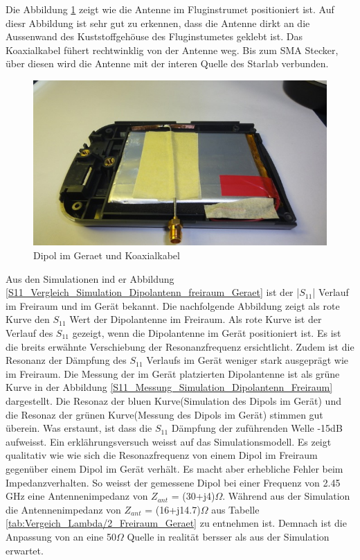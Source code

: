 \newpage
Die Abbildung \ref{fig:DipolimGeraet} zeigt wie die Antenne im Fluginstrumet positioniert ist. Auf diesr Abbildung ist sehr gut zu erkennen, dass die Antenne dirkt an die Aussenwand des Kuststoffgehöuse des Fluginstumetes geklebt ist. Das Koaxialkabel fühert rechtwinklig von der Antenne weg. Bis zum SMA Stecker, über diesen wird die Antenne mit der interen Quelle des Starlab verbunden.\\
\begin{figure}[!ht]
	\centering
	\includegraphics[width=13cm]{content/bilder/Implementierung/DipolKabelGeraet.jpg}%
	\caption{Dipol im Geraet und Koaxialkabel}
	\label{fig:DipolimGeraet}
\end{figure}

\newpage
Aus den Simulationen ind er Abbildung \ref{S11_Vergleich_Simulation_Dipolantenn_freiraum_Geraet} ist der |$S_{11}$| Verlauf im Freiraum und im Gerät bekannt. Die nachfolgende Abbildung zeigt als rote Kurve den $S_{11}$ Wert der Dipolantenne im Freiraum. Als rote Kurve ist der Verlauf des $S_{11}$ gezeigt, wenn die Dipolantenne im Gerät positioniert ist. Es ist die breits erwähnte Verschiebung der Resonanzfrequenz ersichtlicht. Zudem ist die Resonanz der Dämpfung des $S_{11}$ Verlaufs im Gerät weniger stark ausgeprägt wie im Freiraum. Die Messung der im Gerät platzierten Dipolantenne ist als grüne Kurve in der Abbildung \ref{S11_Messung_Simulation_Dipolantenn_Freiraum} dargestellt. Die Resonaz der bluen Kurve(Simulation des Dipols im Gerät) und die Resonaz der grünen Kurve(Messung des Dipols im Gerät) stimmen gut überein. Was erstaunt, ist dass die $S_{11}$ Dämpfung der zuführenden Welle -15dB aufweisst. Ein erklährungsversuch weisst auf das Simulationsmodell. Es zeigt qualitativ wie wie sich die Resonazfrequenz von einem Dipol im Freiraum gegenüber einem Dipol im Gerät verhält. Es macht aber erhebliche Fehler beim Impedanzverhalten. So weisst der gemessene Dipol bei einer Frequenz von 2.45 GHz eine Antennenimpedanz von $Z_{ant}$ = (30+j4)$\Omega$. Während aus der Simulation die Antennenimpedanz von $Z_{ant}$ = (16+j14.7)$\Omega$ aus Tabelle \ref{tab:Vergeich_Lambda/2_Freiraum_Geraet} zu entnehmen ist. Demnach ist die Anpassung von an eine 50$\Omega$ Quelle in realität bersser als aus der Simulation erwartet.


